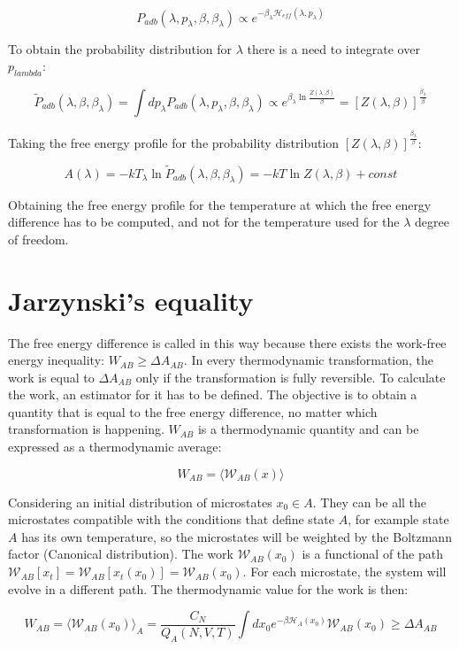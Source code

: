 	$$P_{adb}(\lambda, p_\lambda, \beta, \beta_\lambda)\propto e^{-\beta_\lambda\mathcal{H}_{eff}(\lambda, p_\lambda)}$$

	To obtain the probability distribution for $\lambda$ there is a need to integrate over $p_{lambda}$:

	$$\tilde{P}_{adb}(\lambda, \beta, \beta_\lambda) = \int dp_\lambda P_{adb}(\lambda, p_\lambda, \beta, \beta_\lambda)\propto e^{\beta_\lambda\ln \frac{Z(\lambda, \beta)}{\beta}} = [Z(\lambda, \beta)]^{\frac{\beta_\lambda}{\beta}}$$

	Taking the free energy profile for the probability distribution $[Z(\lambda, \beta)]^{\frac{\beta_\lambda}{\beta}}$:

	$$A(\lambda) = -kT_\lambda\ln\tilde{P}_{adb}(\lambda, \beta, \beta_\lambda) = -kT\ln Z(\lambda, \beta) + const$$

	Obtaining the free energy profile for the temperature at which the free energy difference has to be computed, and not for the temperature used for the $\lambda$ degree of freedom.

\section{Jarzynski's equality}
The free energy difference is called in this way because there exists the work-free energy inequality: $W_{AB}\ge \Delta A_{AB}$.
In every thermodynamic transformation, the work is equal to $\Delta A_{AB}$ only if the transformation is fully reversible.
To calculate the work, an estimator for it has to be defined.
The objective is to obtain a quantity that is equal to the free energy difference, no matter which transformation is happening.
$W_{AB}$ is a thermodynamic quantity and can be expressed as a thermodynamic average:

$$W_{AB} = \langle\mathcal{W}_{AB}(x)\rangle$$

Considering an initial distribution of microstates $x_0\in A$.
They can be all the microstates compatible with the conditions that define state $A$, for example state $A$ has its own temperature, so the microstates will be weighted by the Boltzmann factor (Canonical distribution).
The work $\mathcal{W}_{AB}(x_0)$ is a functional of the path $\mathcal{W}_{AB}[x_t] = \mathcal{W}_{AB}[x_t(x_0)] = \mathcal{W}_{AB}(x_0)$.
For each microstate, the system will evolve in a different path.
The thermodynamic value for the work is then:

$$W_{AB} = \langle\mathcal{W}_{AB}(x_0)\rangle_A=\frac{C_N}{Q_A(N, V, T)}\int dx_0e^{-\beta\mathcal{H}_A(x_0)}\mathcal{W}_{AB}(x_0)\ge \Delta A_{AB}$$

